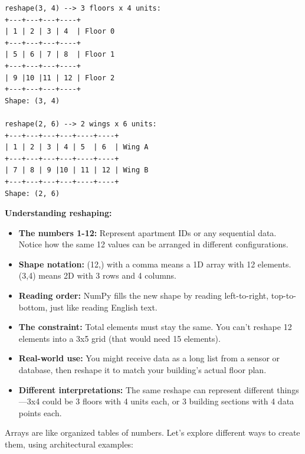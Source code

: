 \begin{tcolorbox}[
    title=Visualizing arrays as buildings,
    colframe=purple,
    colback = white,
    arc=2mm,
    breakable
]
\begin{lstlisting}[basicstyle=\ttfamily\footnotesize,breaklines=true,columns=fullflexible,keepspaces=true,xleftmargin=0pt]
reshape(3, 4) --> 3 floors x 4 units:
+---+---+---+----+
| 1 | 2 | 3 | 4  | Floor 0
+---+---+---+----+
| 5 | 6 | 7 | 8  | Floor 1
+---+---+---+----+
| 9 |10 |11 | 12 | Floor 2
+---+---+---+----+
Shape: (3, 4)

reshape(2, 6) --> 2 wings x 6 units:
+---+---+---+---+----+----+
| 1 | 2 | 3 | 4 | 5  | 6  | Wing A
+---+---+---+---+----+----+
| 7 | 8 | 9 |10 | 11 | 12 | Wing B
+---+---+---+---+----+----+
Shape: (2, 6)
\end{lstlisting}

\textbf{Understanding reshaping:}
\begin{itemize}
\item \textbf{The numbers 1-12:} Represent apartment IDs or any sequential data. Notice how the same 12 values can be arranged in different configurations.
\item \textbf{Shape notation:} (12,) with a comma means a 1D array with 12 elements. (3,4) means 2D with 3 rows and 4 columns.
\item \textbf{Reading order:} NumPy fills the new shape by reading left-to-right, top-to-bottom, just like reading English text.
\item \textbf{The constraint:} Total elements must stay the same. You can't reshape 12 elements into a 3x5 grid (that would need 15 elements).
\item \textbf{Real-world use:} You might receive data as a long list from a sensor or database, then reshape it to match your building's actual floor plan.
\item \textbf{Different interpretations:} The same reshape can represent different things---3x4 could be 3 floors with 4 units each, or 3 building sections with 4 data points each.
\end{itemize}
\end{tcolorbox}


Arrays are like organized tables of numbers. Let's explore different ways to create them, using architectural examples:

